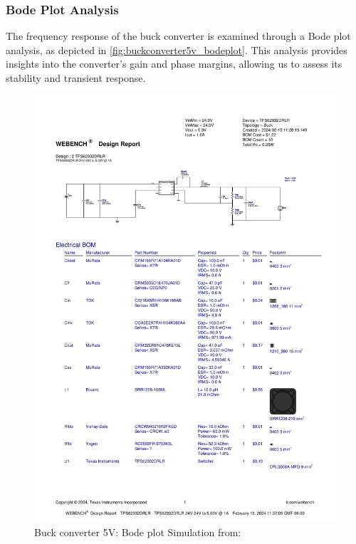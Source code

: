 \subsubsection{Bode Plot Analysis}
The frequency response of the buck converter is examined through a Bode plot analysis, as depicted in \autoref{fig:buckconverter5v_bodeplot}. This analysis provides insights into the converter's gain and phase margins, allowing us to assess its stability and transient response.
\begin{figure}[H]
    \centering
    \includegraphics[trim=0 165 0 70,clip,width=0.8\linewidth,page=8]{img//buckconverters//5v/WBDesign2_Bode Plot.pdf}
    \caption{Buck converter 5V: Bode plot Simulation from: %
    }
    \label{fig:buckconverter5v_bodeplot}
\end{figure}

